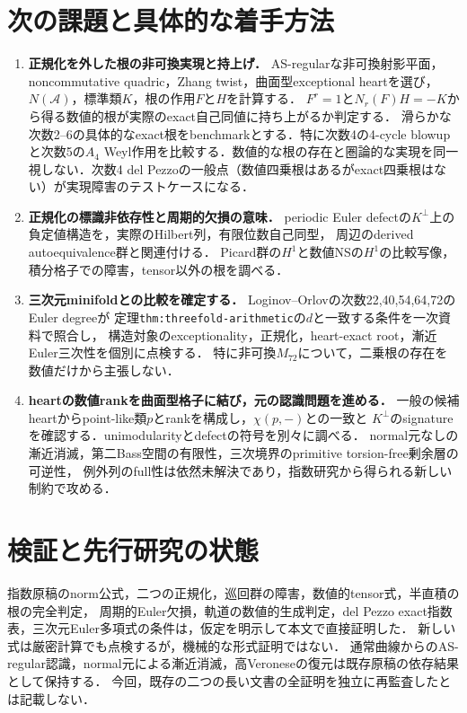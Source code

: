\documentclass[11pt,a4paper]{ltjsarticle}
\begin{document}
\section{次の課題と具体的な着手方法}
\begin{enumerate}
\item \textbf{正規化を外した根の非可換実現と持上げ．}
AS-regularな非可換射影平面，noncommutative quadric，Zhang twist，曲面型exceptional heartを選び，
$N(\mathcal A)$，標準類$K$，根の作用$F$と$H$を計算する．
$F^r=1$と$N_r(F)H=-K$から得る数値的根が実際のexact自己同値に持ち上がるか判定する．
滑らかな次数2--6の具体的なexact根をbenchmarkとする．特に次数4の4-cycle blowupと次数5の$A_4$ Weyl作用を比較する．数値的な根の存在と圏論的な実現を同一視しない．次数4 del Pezzoの一般点（数値四乗根はあるがexact四乗根はない）が実現障害のテストケースになる．
\item \textbf{正規化の標識非依存性と周期的欠損の意味．}
periodic Euler defectの$K^\perp$上の負定値構造を，実際のHilbert列，有限位数自己同型，
周辺のderived autoequivalence群と関連付ける．
Picard群の$H^1$と数値NSの$H^1$の比較写像，積分格子での障害，tensor以外の根を調べる．
\item \textbf{三次元minifoldとの比較を確定する．}
Loginov--Orlovの次数22,40,54,64,72のEuler degreeが
定理\texttt{thm:threefold-arithmetic}の$d$と一致する条件を一次資料で照合し，
構造対象のexceptionality，正規化，heart-exact root，漸近Euler三次性を個別に点検する．
特に非可換$M_{72}$について，二乗根の存在を数値だけから主張しない．
\item \textbf{heartの数値rankを曲面型格子に結び，元の認識問題を進める．}
一般の候補heartからpoint-like類$p$とrankを構成し，$\chi(p,-)$との一致と
$K^\perp$のsignatureを確認する．unimodularityとdefectの符号を別々に調べる．
normal元なしの漸近消滅，第二Bass空間の有限性，三次境界のprimitive torsion-free剰余層の可逆性，
例外列のfull性は依然未解決であり，指数研究から得られる新しい制約で攻める．
\end{enumerate}

\section{検証と先行研究の状態}
指数原稿のnorm公式，二つの正規化，巡回群の障害，数値的tensor式，半直積の根の完全判定，
周期的Euler欠損，軌道の数値的生成判定，del Pezzo exact指数表，三次元Euler多項式の条件は，仮定を明示して本文で直接証明した．
新しい式は厳密計算でも点検するが，機械的な形式証明ではない．
通常曲線からのAS-regular認識，normal元による漸近消滅，高Veroneseの復元は既存原稿の依存結果として保持する．
今回，既存の二つの長い文書の全証明を独立に再監査したとは記載しない．
\end{document}
